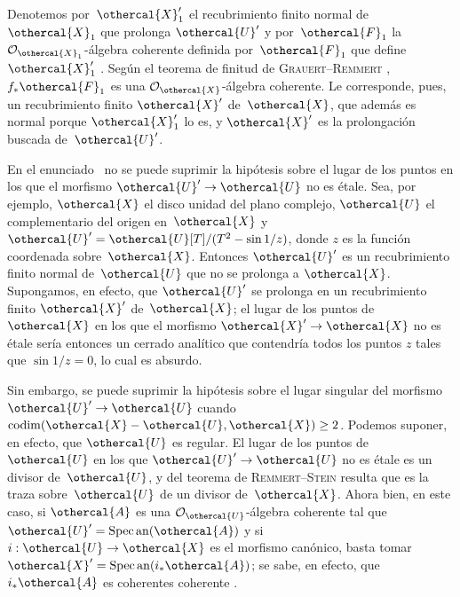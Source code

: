 Denotemos por~$\othercal{X}_1'$ el recubrimiento finito normal de
$\othercal{X}_1$ que prolonga $\othercal{U}'$ y por~$\othercal{F}_1$ la
$\cal{O}_{\othercal{X}_1}$-álgebra coherente
{definida por~$\othercal{F}_1$}
{que define~$\othercal{X}_1'$}%
. Según el teorema de finitud de
\textsc{Grauert}--\textsc{Remmert}
\hbox{\cite[ th]{XII.4}}, $f_*\othercal{F}_1$ es una
$\cal{O}_{\othercal{X}}$-álgebra coherente. Le corresponde, pues, un
recubrimiento finito $\othercal{X}'$ de~$\othercal{X}$, que además es
normal porque $\othercal{X}_1'$ lo es, y $\othercal{X}'$ es la
prolongación buscada de~$\othercal{U}'$.

\begin{remarque}
\label{XII.5.5}
En el enunciado~ no se puede suprimir la hipótesis sobre el
lugar de los puntos en los que el morfismo
$\othercal{U}'\to\othercal{U}$ no es étale. Sea, por ejemplo,
$\othercal{X}$ el disco unidad del plano complejo, $\othercal{U}$ el
complementario del origen en~$\othercal{X}$ y
$\othercal{U}'=\othercal{U}[T]/(T^2-\sin 1/z)$, donde $z$ es la función
coordenada sobre~$\othercal{X}$. Entonces $\othercal{U}'$ es un
recubrimiento finito normal de~$\othercal{U}$ que no se prolonga a
$\othercal{X}$. Supongamos, en efecto, que $\othercal{U}'$ se prolonga
en un recubrimiento finito $\othercal{X}'$ de~$\othercal{X}$; el lugar de
los puntos de~$\othercal{X}$ en los que el morfismo
$\othercal{X}'\to\othercal{X}$ no es étale sería entonces un cerrado
analítico que contendría todos los puntos $z$ tales que
$\sin 1/z=0$, lo cual es absurdo.

Sin embargo, se puede suprimir la hipótesis sobre el lugar singular del
morfismo $\othercal{U}'\to\othercal{U}$ cuando
$\codim(\othercal{X}-\othercal{U},\othercal{X})\geq2$. Podemos suponer,
en efecto, que $\othercal{U}$ es regular. El lugar de los puntos de
$\othercal{U}$ en los que $\othercal{U}'\to\othercal{U}$ no es étale es
un divisor de~$\othercal{U}$, y del teorema de
\textsc{Remmert}--\textsc{Stein} \cite[th]{XII.9} resulta que es
la traza sobre~$\othercal{U}$ de un divisor de~$\othercal{X}$. Ahora
bien, en este caso, si $\othercal{A}$ es una
$\cal{O}_{\othercal{U}}$-álgebra coherente tal que
$\othercal{U}'=\Spec\an(\othercal{A})$ y si
$i:\othercal{U}\to\othercal{X}$ es el morfismo canónico, basta
tomar $\othercal{X}'=\Spec\an(i_*\othercal{A})$; se sabe, en efecto, que
$i_*\othercal{A}$ es
{coherentes}
{coherente}
\cite[ th]{XII.11}.
\end{remarque}

